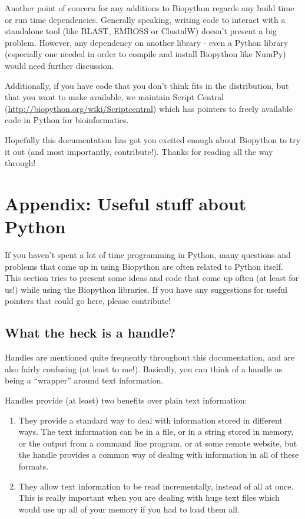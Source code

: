 \documentclass{report}
\begin{document}
Another point of concern for any additions to Biopython regards any build time or run time dependencies.  Generally speaking, writing code to interact with a standalone tool (like BLAST, EMBOSS or ClustalW) doesn't present a big problem.  However, any dependency on another library - even a Python library (especially one needed in order to compile and install Biopython like NumPy) would need further discussion.

Additionally, if you have code that you don't think fits in the
distribution, but that you want to make available, we maintain Script
Central (\url{http://biopython.org/wiki/Scriptcentral})
which has pointers to freely available code in Python for bioinformatics.

Hopefully this documentation has got you excited enough about
Biopython to try it out (and most importantly, contribute!). Thanks
for reading all the way through!

\chapter{Appendix: Useful stuff about Python}
\label{sec:appendix}

If you haven't spent a lot of time programming in Python, many
questions and problems that come up in using Biopython are often
related to Python itself. This section tries to present some ideas and
code that come up often (at least for us!) while using the Biopython
libraries. If you have any suggestions for useful pointers that could
go here, please contribute!

\section{What the heck is a handle?}
\label{sec:appendix-handles}

Handles are mentioned quite frequently throughout this documentation,
and are also fairly confusing (at least to me!). Basically, you can
think of a handle as being a ``wrapper'' around text information.

Handles provide (at least) two benefits over plain text information:

\begin{enumerate}
  \item They provide a standard way to deal with information stored in
  different ways. The text information can be in a file, or in a
  string stored in memory, or the output from a command line program,
  or at some remote website, but the handle provides a common way of
  dealing with information in all of these formats.

  \item They allow text information to be read incrementally, instead
  of all at once. This is really important when you are dealing with
  huge text files which would use up all of your memory if you had to
  load them all.
\end{enumerate}
\end{document}
